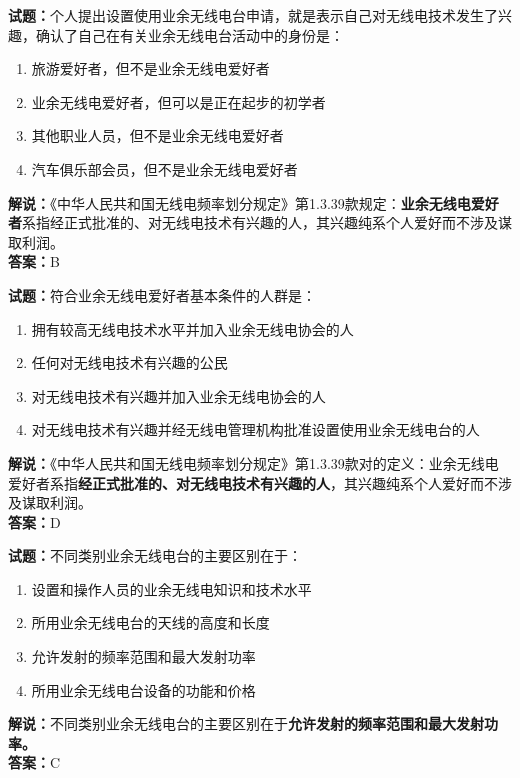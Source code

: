 \documentclass{ctexbook}
\begin{document}
\bigskip

\noindent\textbf{试题：}个人提出设置使用业余无线电台申请，就是表示自己对无线电技术发生了兴趣，确认了自己在有关业余无线电台活动中的身份是：
\begin{enumerate}[leftmargin=3em]
  \item 旅游爱好者，但不是业余无线电爱好者
  \item 业余无线电爱好者，但可以是正在起步的初学者
  \item 其他职业人员，但不是业余无线电爱好者
  \item 汽车俱乐部会员，但不是业余无线电爱好者
\end{enumerate}
\noindent\textbf{解说：}《中华人民共和国无线电频率划分规定》第1.3.39款规定：\textbf{业余无线电爱好者}系指经正式批准的、对无线电技术有兴趣的人，其兴趣纯系个人爱好而不涉及谋取利润。\\\noindent\textbf{答案：}B

\bigskip

\noindent\textbf{试题：}符合业余无线电爱好者基本条件的人群是：
\begin{enumerate}[leftmargin=3em]
  \item 拥有较高无线电技术水平并加入业余无线电协会的人
  \item 任何对无线电技术有兴趣的公民
  \item 对无线电技术有兴趣并加入业余无线电协会的人
  \item 对无线电技术有兴趣并经无线电管理机构批准设置使用业余无线电台的人
\end{enumerate}
\noindent\textbf{解说：}《中华人民共和国无线电频率划分规定》第1.3.39款对的定义：业余无线电爱好者系指\textbf{经正式批准的、对无线电技术有兴趣的人}，其兴趣纯系个人爱好而不涉及谋取利润。\\\noindent\textbf{答案：}D

\bigskip

\noindent\textbf{试题：}不同类别业余无线电台的主要区别在于：
\begin{enumerate}[leftmargin=3em]
  \item 设置和操作人员的业余无线电知识和技术水平
  \item 所用业余无线电台的天线的高度和长度
  \item 允许发射的频率范围和最大发射功率
  \item 所用业余无线电台设备的功能和价格
\end{enumerate}
\noindent\textbf{解说：}不同类别业余无线电台的主要区别在于\textbf{允许发射的频率范围和最大发射功率。}\\\noindent\textbf{答案：}C
\end{document}
